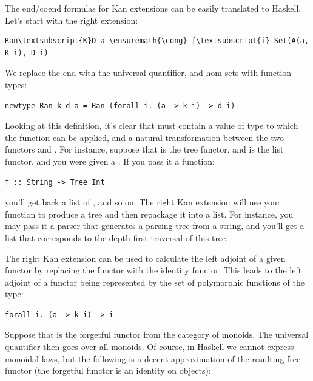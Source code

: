 The end/coend formulas for Kan extensions can be easily translated to
Haskell. Let's start with the right extension:

\begin{Verbatim}[commandchars=\\\{\}]
Ran\textsubscript{K}D a \ensuremath{\cong} ∫\textsubscript{i} Set(A(a, K i), D i)
\end{Verbatim}
We replace the end with the universal quantifier, and hom-sets with
function types:

\begin{Verbatim}[commandchars=\\\{\}]
newtype Ran k d a = Ran (forall i. (a -> k i) -> d i)
\end{Verbatim}
Looking at this definition, it's clear that  must contain a
value of type  to which the function can be applied, and a
natural transformation between the two functors  and
. For instance, suppose that  is the tree functor,
and  is the list functor, and you were given a
. If you pass it a function:

\begin{Verbatim}[commandchars=\\\{\}]
f :: String -> Tree Int
\end{Verbatim}
you'll get back a list of , and so on. The right Kan
extension will use your function to produce a tree and then repackage it
into a list. For instance, you may pass it a parser that generates a
parsing tree from a string, and you'll get a list that corresponds to
the depth-first traversal of this tree.

The right Kan extension can be used to calculate the left adjoint of a
given functor by replacing the functor  with the identity
functor. This leads to the left adjoint of a functor  being
represented by the set of polymorphic functions of the type:

\begin{Verbatim}[commandchars=\\\{\}]
forall i. (a -> k i) -> i
\end{Verbatim}
Suppose that  is the forgetful functor from the category of
monoids. The universal quantifier then goes over all monoids. Of course,
in Haskell we cannot express monoidal laws, but the following is a
decent approximation of the resulting free functor (the forgetful
functor  is an identity on objects):

